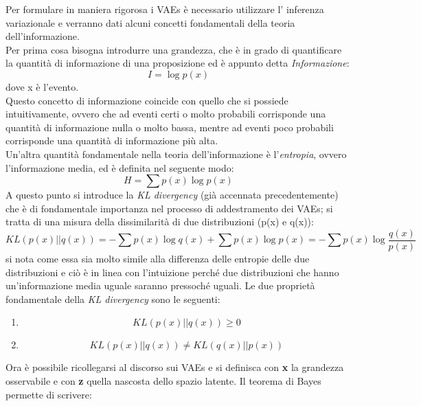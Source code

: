 Per formulare in maniera rigorosa i VAEs è necessario utilizzare l' inferenza variazionale e verranno dati alcuni concetti fondamentali della teoria dell'informazione. \\
Per prima cosa bisogna introdurre una grandezza, che è in grado di quantificare la quantità di informazione di una proposizione ed è appunto detta \textit{Informazione}:
\begin{equation}
	I = \log p(x)
\end{equation}
dove x è l'evento. \\
Questo concetto di informazione coincide con quello che si possiede intuitivamente, ovvero che ad eventi certi o molto probabili corrisponde una quantità di informazione nulla o molto bassa, mentre ad eventi poco probabili corrisponde una quantità di informazione più alta. \\ 
Un'altra quantità fondamentale nella teoria dell'informazione è l'\textit{entropia}, ovvero l'informazione media, ed è definita nel seguente modo:
\begin{equation}
	H = \sum p(x) \log p(x)
\end{equation}
A questo punto si introduce la \textit{KL divergency} (già accennata precedentemente) che è di fondamentale importanza nel processo di addestramento dei VAEs; si tratta di una misura della dissimilarità di due distribuzioni (p(x) e q(x)):
\begin{equation}
	KL(p(x)||q(x)) = -\sum p(x) \log q(x) + \sum p(x) \log p(x) = -\sum p(x) \log \frac{q(x)}{p(x)}
\end{equation}
si nota come essa sia molto simile alla differenza delle entropie delle due distribuzioni e ciò è in linea con l'intuizione perché due distribuzioni che hanno un'informazione media uguale saranno pressoché uguali.
Le due proprietà fondamentale della \textit{KL divergency} sono le seguenti:
\begin{enumerate}
	\item 
	\begin{equation}
		KL(p(x)||q(x)) \geq 0
	\end{equation}
	
	\item 
	\begin{equation}
		KL(p(x)||q(x)) \not = KL(q(x)||p(x))
	\end{equation}
\end{enumerate}
Ora è possibile ricollegarsi al discorso sui VAEs e si definisca con \textbf{x} la grandezza osservabile e con \textbf{z} quella nascosta dello spazio latente. Il teorema di Bayes \cite{Statistica} permette di scrivere:
